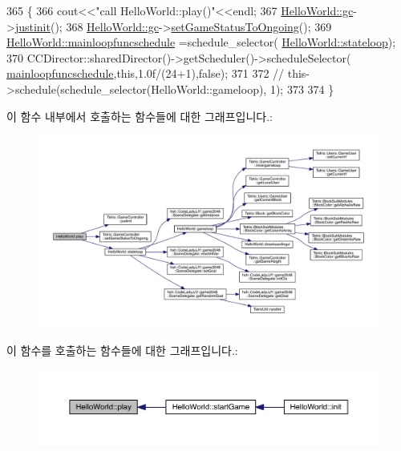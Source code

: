 \begin{DoxyCode}
365                              \{
366     cout<<\textcolor{stringliteral}{"call HelloWorld::play()"}<<endl;
367     \hyperlink{class_hello_world_a547cb213126911d9a7151f8259dc7102}{HelloWorld::gc}->\hyperlink{class_tetris_1_1_game_controller_aef406397d4719c9edd49774d0343ce05}{justinit}();
368     \hyperlink{class_hello_world_a547cb213126911d9a7151f8259dc7102}{HelloWorld::gc}->\hyperlink{class_tetris_1_1_game_controller_a47681985e6fbf14411a70be08f85bf99}{setGameStatusToOngoing}();
369     \hyperlink{class_hello_world_a01e6475e24156e4f8b396c8e726f6260}{HelloWorld::mainloopfuncschedule} =schedule\_selector(
      \hyperlink{class_hello_world_a4ab71b15b7e362af143d2a539e39a538}{HelloWorld::stateloop});
370     CCDirector::sharedDirector()->getScheduler()->scheduleSelector(
      \hyperlink{class_hello_world_a01e6475e24156e4f8b396c8e726f6260}{mainloopfuncschedule},\textcolor{keyword}{this},1.0f/(24+1),\textcolor{keyword}{false});
371     
372    \textcolor{comment}{// this->schedule(schedule\_selector(HelloWorld::gameloop), 1);}
373     
374 \}
\end{DoxyCode}
이 함수 내부에서 호출하는 함수들에 대한 그래프입니다.\+:
\nopagebreak
\begin{figure}[H]
\begin{center}
\leavevmode
\includegraphics[width=350pt]{d9/d98/class_hello_world_ac1aee383de0a7c30e84f7efc0da8d944_cgraph}
\end{center}
\end{figure}
이 함수를 호출하는 함수들에 대한 그래프입니다.\+:
\nopagebreak
\begin{figure}[H]
\begin{center}
\leavevmode
\includegraphics[width=350pt]{d9/d98/class_hello_world_ac1aee383de0a7c30e84f7efc0da8d944_icgraph}
\end{center}
\end{figure}
\mbox{\label{class_hello_world_a0f8c9d1b95e03b397e680b9dafb8f3d9}} 

